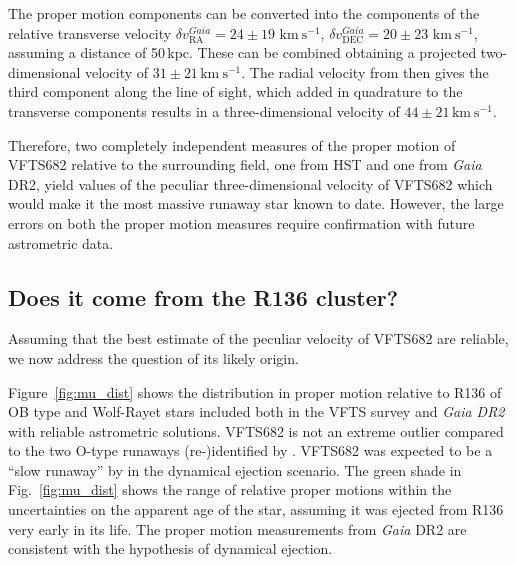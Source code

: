 \documentclass[apjl,twocolumn]{emulateapj}
\newcommand{\kms}{{\,\mathrm{km\ s^{-1}}}}
\DeclareRobustCommand{\Eqref}[1]{Eq.~\ref{#1}}
\DeclareRobustCommand{\Figref}[1]{Fig.~\ref{#1}}
\begin{document}
The proper motion components can be converted into
the components of the relative transverse velocity $\delta v_\mathrm{RA}^{Gaia}=24\pm19\,\kms$,
$\delta v_\mathrm{DEC}^{Gaia}=20\pm23\,\kms$, assuming a distance of
50\,kpc. These can be combined obtaining a projected two-dimensional
velocity of $31\pm21\kms$. %
The radial velocity from
\cite{bestenlehner:11} then gives the third component along
the line of sight, %
which added in quadrature to the transverse components results in a
three-dimensional velocity of $44 \pm 21\kms$.

Therefore, two completely independent measures of the proper motion of
VFTS682 relative to the surrounding field, one from HST and one from
\emph{Gaia} DR2, yield values of the peculiar three-dimensional
velocity of VFTS682 %
which would make it the most massive runaway star
known to date. However, the large errors on both the proper motion measures
require confirmation with future astrometric data. 

\subsection{Does it come from the R136 cluster?}
\label{sec:r136_origin}

Assuming that the best estimate of the peculiar velocity of VFTS682
are reliable, we now address the question of its likely origin.

Figure~\ref{fig:mu_dist} shows the distribution in proper motion relative to R136
of OB type and Wolf-Rayet stars included both in the VFTS survey and
\emph{Gaia DR2} with reliable astrometric solutions. VFTS682 is not an
extreme outlier compared to the two O-type runaways (re-)identified by
\cite{lennon:18}. VFTS682 was expected to be a ``slow runaway'' by \citet{bestenlehner:11} in
the dynamical ejection scenario. The green shade in
\Figref{fig:mu_dist} shows the range of relative proper motions within
the uncertainties on the apparent age of the star, assuming it was
ejected from R136 very early in its life. The proper motion
measurements from \emph{Gaia} DR2 are consistent with the hypothesis
of dynamical ejection.
\end{document}

